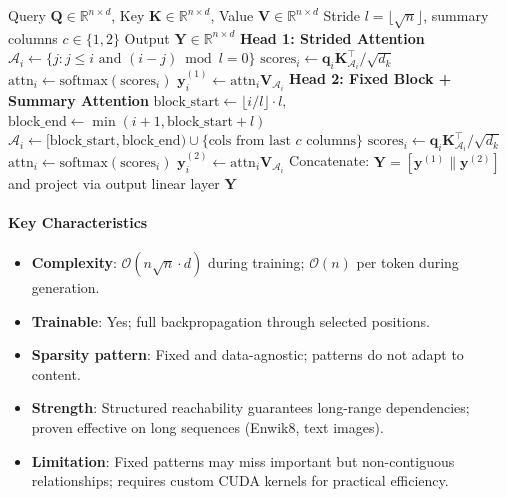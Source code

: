 \begin{algorithm}[H]
\caption{Sparse Transformer Attention: Strided + Fixed Dual Heads}
\begin{algorithmic}[1]
\Require Query $\mathbf{Q} \in \mathbb{R}^{n \times d}$, Key $\mathbf{K} \in \mathbb{R}^{n \times d}$, Value $\mathbf{V} \in \mathbb{R}^{n \times d}$
\Require Stride $l = \lfloor\sqrt{n}\rfloor$, summary columns $c \in \{1, 2\}$
\Ensure Output $\mathbf{Y} \in \mathbb{R}^{n \times d}$
\State \textbf{Head 1: Strided Attention}
    \State $\mathcal{A}_i \gets \{j : j \leq i \text{ and } (i-j) \bmod l = 0\}$ 
    \State $\text{scores}_{i} \gets \mathbf{q}_i \mathbf{K}_{\mathcal{A}_i}^\top / \sqrt{d_k}$
    \State $\text{attn}_{i} \gets \text{softmax}(\text{scores}_{i})$
    \State $\mathbf{y}_i^{(1)} \gets \text{attn}_{i} \mathbf{V}_{\mathcal{A}_i}$
\EndFor
\State \textbf{Head 2: Fixed Block + Summary Attention}
    \State $\text{block\_start} \gets \lfloor i/l \rfloor \cdot l$, $\text{block\_end} \gets \min(i+1, \text{block\_start}+l)$
    \State $\mathcal{A}_i \gets [\text{block\_start}, \text{block\_end}) \cup \{\text{cols from last } c \text{ columns}\}$
    \State $\text{scores}_{i} \gets \mathbf{q}_i \mathbf{K}_{\mathcal{A}_i}^\top / \sqrt{d_k}$
    \State $\text{attn}_{i} \gets \text{softmax}(\text{scores}_{i})$
    \State $\mathbf{y}_i^{(2)} \gets \text{attn}_{i} \mathbf{V}_{\mathcal{A}_i}$
\EndFor
\State Concatenate: $\mathbf{Y} = [\mathbf{y}^{(1)} \| \mathbf{y}^{(2)}]$ and project via output linear layer
\Return $\mathbf{Y}$
\end{algorithmic}
\end{algorithm}

\paragraph{Key Characteristics}

\begin{itemize}[leftmargin=*]
    \item \textbf{Complexity}: $\mathcal{O}(n\sqrt{n} \cdot d)$ during training; $\mathcal{O}(n)$ per token during generation.
    \item \textbf{Trainable}: Yes; full backpropagation through selected positions.
    \item \textbf{Sparsity pattern}: Fixed and data-agnostic; patterns do not adapt to content.
    \item \textbf{Strength}: Structured reachability guarantees long-range dependencies; proven effective on long sequences (Enwik8, text images).
    \item \textbf{Limitation}: Fixed patterns may miss important but non-contiguous relationships; requires custom CUDA kernels for practical efficiency.
\end{itemize}

